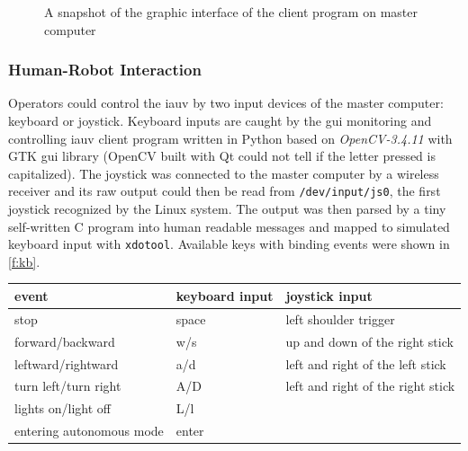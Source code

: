 \begin{figure}[htb]
    \caption[A Snapshot of the Graphic Interface of the Client Program on Master
    Computer]{A snapshot of the graphic interface of the client program on
    master computer}\label{f:interface}
\end{figure}

\subsubsection{Human-Robot Interaction}

Operators could control the \gls{iauv} by two input devices of the master
computer: keyboard or joystick. Keyboard inputs are caught by the \gls{gui}
monitoring and controlling \gls{iauv} client program written in Python based on
\textit{OpenCV-3.4.11} with GTK \gls{gui} library (OpenCV built with Qt could
not tell if the letter pressed is capitalized). The joystick was connected to
the master computer by a wireless receiver and its raw output could then be read
from \texttt{/dev/input/js0}, the first joystick recognized by the Linux system.
The output was then parsed by a tiny self-written C program into human readable
messages and mapped to simulated keyboard input with \texttt{xdotool}. Available
keys with binding events were shown in \autoref{f:kb}.

\begin{table}[htb]
    \centering
    \renewcommand*{\arraystretch}{1.3}
    \begin{tabularx}{\textwidth}{XXX}
        \toprule
        \textbf{event} & \textbf{keyboard input} & \textbf{joystick input} \\
        \midrule
        stop & space & left shoulder trigger\\
        forward/backward & w/s & up and down of the right stick\\
        leftward/rightward & a/d & left and right of the left stick\\
        turn left/turn right & A/D & left and right of the right stick\\
        lights on/light off & L/l & \\
        entering autonomous mode & enter & \\
        \bottomrule
    \end{tabularx}
    \label{f:kb}
\end{table}

